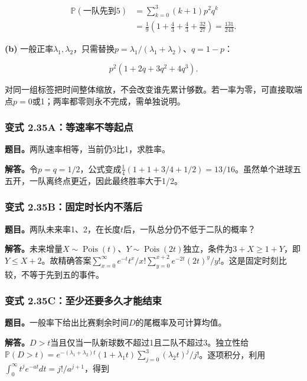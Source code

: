 \documentclass[12pt,a4paper,UTF8,fontset=fandol]{ctexart}
\begin{document}
\[
\begin{aligned}
\mathbb P(\text{一队先到5})
&=\sum_{k=0}^3(k+1)p^2q^k\\
&=\frac19\left(1+\frac43+\frac43+\frac{32}{27}\right)
=\boxed{\frac{131}{243}}.
\end{aligned}
\]

\textbf{(b)}
一般正率\(\lambda_1,\lambda_2\)，只需替换\(p=\lambda_1/(\lambda_1+\lambda_2)\)、\(q=1-p\)：

\[\boxed{p^2(1+2q+3q^2+4q^3).}\]

对同一组标签把时间整体缩放，不会改变谁先累计够数。若一率为零，可直接取端点\(p=0\)或1；两率都零则永不完成，需单独说明。

\subsubsection{变式
2.35A：等速率不等起点}\label{ux53d8ux5f0f-2.35aux7b49ux901fux7387ux4e0dux7b49ux8d77ux70b9}

\textbf{题目。}两队速率相等，当前仍3比1，求胜率。

\textbf{解答。}令\(p=q=1/2\)，公式变成\(\frac14(1+1+3/4+1/2)=13/16\)。虽然单个进球五五开，一队离终点更近，因此最终胜率大于1/2。

\subsubsection{变式
2.35B：固定时长内不落后}\label{ux53d8ux5f0f-2.35bux56faux5b9aux65f6ux957fux5185ux4e0dux843dux540e}

\textbf{题目。}两队未来率1、2，在长度\(t\)后，一队总分仍不低于二队的概率？

\textbf{解答。}未来增量\(X\sim\operatorname{Pois}(t)\)、\(Y\sim\operatorname{Pois}(2t)\)独立，条件为\(3+X\ge1+Y\)，即\(Y\le X+2\)。故精确答案\(\sum_{x=0}^\infty e^{-t}t^x/x!\sum_{y=0}^{x+2}e^{-2t}(2t)^y/y!\)。这是固定时刻比较，不等于先到五的事件。

\subsubsection{变式
2.35C：至少还要多久才能结束}\label{ux53d8ux5f0f-2.35cux81f3ux5c11ux8fd8ux8981ux591aux4e45ux624dux80fdux7ed3ux675f}

\textbf{题目。}一般率下给出比赛剩余时间\(D\)的尾概率及可计算均值。

\textbf{解答。}\(D>t\)当且仅当一队新球数不超过1且二队不超过3。独立性给\(\mathbb P(D>t)=e^{-(\lambda_1+\lambda_2)t}(1+\lambda_1t)\sum_{j=0}^3(\lambda_2t)^j/j!\)。逐项积分，利用\(\int_0^\infty t^j e^{-at}dt=j!/a^{j+1}\)，得到
\end{document}
